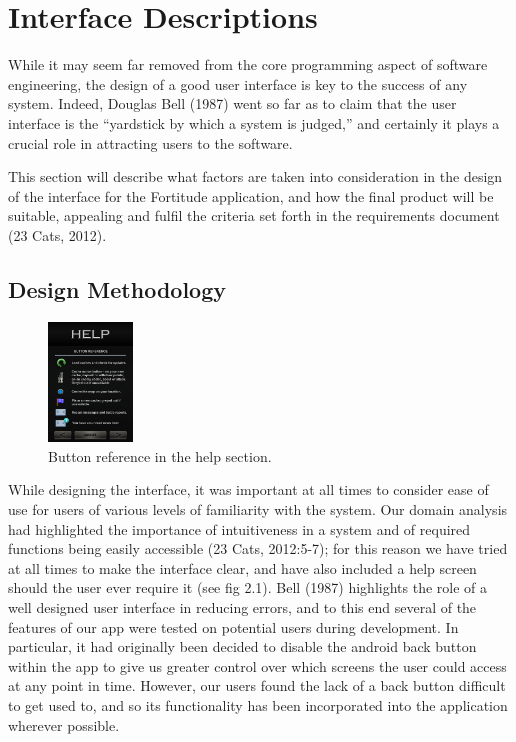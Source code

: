 \section{Interface Descriptions}
While it may seem far removed from the core programming aspect of software engineering, the design of a good user interface is key to the success of any system. Indeed, Douglas Bell (1987) went so far as to claim that the user interface is the “yardstick by which a system is judged,” and certainly it plays a crucial role in attracting users to the software.

This section will describe what factors are taken into consideration in the design of the interface for the Fortitude application, and how the final product will be suitable, appealing and fulfil the criteria set forth in the requirements document (23 Cats, 2012).

\subsection{Design Methodology}

\begin{figure}
	\vspace{-20pt}
	\begin{center}
	\includegraphics[width=0.2\textwidth]{images/helpMockup.gif}
	\caption{Button reference in the help section.}
	\end{center}
	\vspace{-10pt}
\end{figure}

While designing the interface, it was important at all times to consider ease of use for users of various levels of familiarity with the system. Our domain analysis had highlighted the importance of intuitiveness in a system and of required functions being easily accessible (23 Cats, 2012:5-7); for this reason we have tried at all times to make the interface clear, and have also included a help screen should the user ever require it (see fig 2.1). Bell (1987) highlights the role of a well designed user interface in reducing errors, and to this end several of the features of our app were tested on potential users during development. In particular, it had originally been decided to disable the android back button within the app to give us greater control over which screens the user could access at any point in time. However, our users found the lack of a back button difficult to get used to, and so its functionality has been incorporated into the application wherever possible.

